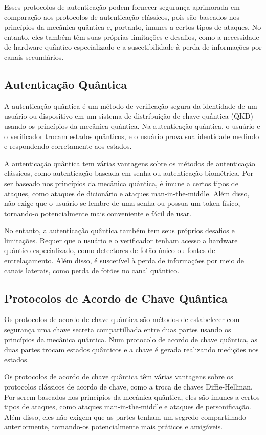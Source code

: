 Esses protocolos de autenticação podem fornecer segurança aprimorada em comparação aos protocolos de autenticação clássicos, pois são baseados nos princípios da mecânica quântica e, portanto, imunes a certos tipos de ataques. No entanto, eles também têm suas próprias limitações e desafios, como a necessidade de hardware quântico especializado e a suscetibilidade à perda de informações por canais secundários.

\subsection{Autenticação Quântica}

A autenticação quântica é um método de verificação segura da identidade de um usuário ou dispositivo em um sistema de distribuição de chave quântica (QKD) usando os princípios da mecânica quântica. Na autenticação quântica, o usuário e o verificador trocam estados quânticos, e o usuário prova sua identidade medindo e respondendo corretamente aos estados.

A autenticação quântica tem várias vantagens sobre os métodos de autenticação clássicos, como autenticação baseada em senha ou autenticação biométrica. Por ser baseado nos princípios da mecânica quântica, é imune a certos tipos de ataques, como ataques de dicionário e ataques man-in-the-middle. Além disso, não exige que o usuário se lembre de uma senha ou possua um token físico, tornando-o potencialmente mais conveniente e fácil de usar.

No entanto, a autenticação quântica também tem seus próprios desafios e limitações. Requer que o usuário e o verificador tenham acesso a hardware quântico especializado, como detectores de fotão único ou fontes de entrelaçamento. Além disso, é suscetível à perda de informações por meio de canais laterais, como perda de fotões no canal quântico.

\subsection{Protocolos de Acordo de Chave Quântica}

Os protocolos de acordo de chave quântica são métodos de estabelecer com segurança uma chave secreta compartilhada entre duas partes usando os princípios da mecânica quântica. Num protocolo de acordo de chave quântica, as duas partes trocam estados quânticos e a chave é gerada realizando medições nos estados.

Os protocolos de acordo de chave quântica têm várias vantagens sobre os protocolos clássicos de acordo de chave, como a troca de chaves Diffie-Hellman. Por serem baseados nos princípios da mecânica quântica, eles são imunes a certos tipos de ataques, como ataques man-in-the-middle e ataques de personificação. Além disso, eles não exigem que as partes tenham um segredo compartilhado anteriormente, tornando-os potencialmente mais práticos e amigáveis.

